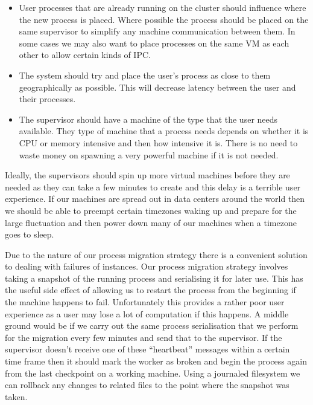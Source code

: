 \documentclass[12pt, a4paper]{article}
\begin{document}
\begin{itemize}

	\item

	User processes that are already running on the cluster should influence
	where the new process is placed. Where possible the process should be
	placed on the same supervisor to simplify any machine communication between
	them. In some cases we may also want to place processes on the same VM as
	each other to allow certain kinds of IPC.

	\item

	The system should try and place the user's process as close to them
	geographically as possible. This will decrease latency between the user and
	their processes.

	\item

	The supervisor should have a machine of the type that the user needs
	available. They type of machine that a process needs depends on whether it
	is CPU or memory intensive and then how intensive it is. There is no need
	to waste money on spawning a very powerful machine if it is not needed.

\end{itemize}

Ideally, the supervisors should spin up more virtual machines before they are
needed as they can take a few minutes to create and this delay is a terrible
user experience. If our machines are spread out in data centers around the
world then we should be able to preempt certain timezones waking up and prepare
for the large fluctuation and then power down many of our machines when
a timezone goes to sleep.

Due to the nature of our process migration strategy there is a convenient
solution to dealing with failures of instances. Our process migration strategy
involves taking a snapshot of the running process and serialising it for later
use. This has the useful side effect of allowing us to restart the process from
the beginning if the machine happens to fail. Unfortunately this provides
a rather poor user experience as a user may lose a lot of computation if this
happens. A middle ground would be if we carry out the same process
serialisation that we perform for the migration every few minutes and send that
to the supervisor. If the supervisor doesn't receive one of these ``heartbeat''
messages within a certain time frame then it should mark the worker as broken
and begin the process again from the last checkpoint on a working machine.
Using a journaled filesystem we can rollback any changes to related files to
the point where the snapshot was taken.
\end{document}
